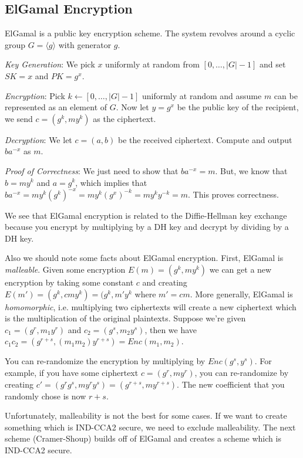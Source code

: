 \documentclass[psamsfonts]{amsart}
\begin{document}
\subsection{ElGamal Encryption}

ElGamal is a public key encryption scheme. The system revolves around a cyclic group $G = \langle g \rangle$ with generator $g$.

\emph{Key Generation}: We pick $x$ uniformly at random from $[0, \ldots, |G|-1]$ and set $SK = x$ and $PK = g^x$.

\emph{Encryption}: Pick $k \leftarrow [0, \ldots, |G|-1]$ uniformly at random and assume $m$ can be represented as an element of $G$. Now let $y = g^x$ be the public key of the recipient, we send $c = (g^k, m y^k)$ as the ciphertext.

\emph{Decryption}: We let $c = (a,b)$ be the received ciphertext. Compute and output $b a^{-x}$ as $m$.

\emph{Proof of Correctness}: We just need to show that $b a^{-x} = m$. But, we know that $b = m y^k$ and $a = g^k$, which implies that $b a^{-x} = m y^k (g^k)^{-x} = m y^k (g^x)^{-k} = m y^k y^{-k} = m$. This proves correctness.

We see that ElGamal encryption is related to the Diffie-Hellman key exchange because you encrypt by multiplying by a DH key and decrypt by dividing by a DH key.

Also we should note some facts about ElGamal encryption. First, ElGamal is \emph{malleable}. Given some encryption $E(m) = (g^k, m y^k)$ we can get a new encryption by taking some constant $c$ and creating $E(m') = (g^k, c m y^k) = (g^k, m' y^k$ where $m' = c m$. More generally, ElGamal is \emph{homomorphic}, i.e. multiplying two ciphertexts will create a new ciphertext which is the multiplication of the original plaintexts. Suppose we're given $c_1 = (g^r, m_1 y^r)$ and $c_2 = (g^s, m_2 y^s)$, then we have $c_1 c_2 = (g^{r+s}, (m_1 m_2) y^{r+s}) = Enc(m_1, m_2)$.

You can re-randomize the encryption by multiplying by $Enc(g^s, y^s)$. For example, if you have some ciphertext $c = (g^r, m y^r)$, you can re-randomize by creating $c' = (g^r g^s, m y^r y^s) = (g^{r+s}, m y^{r+s})$. The new coefficient that you randomly chose is now $r+s$.

Unfortunately, malleability is not the best for some cases. If we want to create something which is IND-CCA2 secure, we need to exclude malleability. The next scheme (Cramer-Shoup) builds off of ElGamal and creates a scheme which is IND-CCA2 secure.
\end{document}
